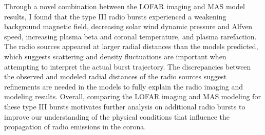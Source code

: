 Through a novel combination between the LOFAR imaging and MAS model results, I found that the type III radio bursts experienced a weakening background magnetic field, decreasing solar wind dynamic pressure and Alfven speed, increasing plasma beta and coronal temperature, and plasma rarefaction.
The radio sources appeared at larger radial distances than the models predicted, which suggests scattering and density fluctuations are important when attempting to interpret the actual burst trajectory.
The discrepancies between the observed and modeled radial distances of the radio sources suggest refinements are needed in the models to fully explain the radio imaging and modeling results. Overall, comparing the LOFAR imaging and MAS modeling for these type III bursts motivates further analysis on additional radio bursts to improve our understanding of the physical conditions that influence the propagation of radio emissions in the corona.
